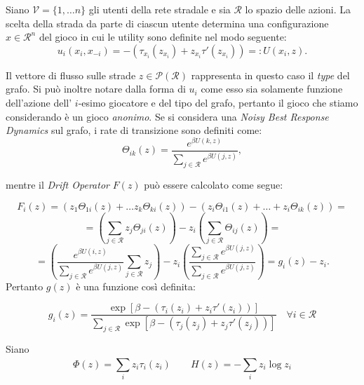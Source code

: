 \begin{alphaparts}
\questionpart %
Siano \(\mathcal{V} = \{1, \dots n\}\) gli utenti della rete stradale e sia \(\mathcal{R}\) lo spazio delle azioni. La scelta della strada da parte di ciascun utente determina una configurazione \(x \in \mathcal{R}^n\) del gioco in cui le utility sono definite nel modo seguente:
\[
    u_i (x_i, x_{- i}) = - (\tau_{x_i}(z_{x_i}) + z_{x_i}\tau'(z_{x_i})) = : U(x_{i}, z).\]

Il vettore di flusso sulle strade \(z \in \mathcal{P}(\mathcal{R})\) rappresenta in questo caso il \textit{type} del grafo. Si può inoltre notare dalla forma di \(u_i\) come esso sia solamente funzione dell'azione dell' \(i\)-esimo giocatore e del tipo del grafo, pertanto il gioco che stiamo considerando è un gioco \textit{anonimo}. Se si considera una \textit{Noisy Best Response Dynamics} sul grafo, i rate di transizione sono definiti come:
\begin{equation*}
    \Theta_{ik}(z) = \frac{e^{\beta U(k, z)}}{ \sum \limits_{j \in \mathcal{R}}^{} e^{\beta U(j, z)}},
\end{equation*} 

mentre il \textit{Drift Operator} \(F(z)\) può essere calcolato come segue:

\[
F_i(z) = (z_1 \Theta_{1i}(z) + \dots z_k \Theta_{ki}(z) ) - (z_i \Theta_{i1}(z) + \dots + z_i \Theta_{ik}(z) ) =
\]
\[ 
 = \left(\sum \limits_{j \in \mathcal{R}}^{} z_j \Theta_{ji}(z) \right) - z_i \left( \sum \limits_{j \in \mathcal{R}}^{} \Theta_{ij}(z)\right) =    
\]
\[
    = \left(\frac{e^{\beta U(i, z)}}{ \sum \limits_{j \in \mathcal{R}}^{} e^{\beta U(j, z)}}  \sum \limits_{j \in \mathcal{R}}^{} z_j \right) - z_i \left( \frac{\sum \limits_{j \in \mathcal{R}}^{} e^{\beta U(j, z)}}{ \sum \limits_{j \in \mathcal{R}}^{} e^{\beta U(j, z)}}\right) = g_i(z) - z_i.
\]
Pertanto \(g(z)\) è una funzione così definita:

\begin{equation*}
    g_i(z) = \frac{\exp [\beta - (\tau_{i}(z_{i}) + z_{i}\tau'(z_{i})) ]}{ \sum \limits_{j \in \mathcal{R}}^{} \exp [\beta - (\tau_{j}(z_{j}) + z_{j}\tau'(z_{j})) ]} \quad \forall i \in \mathcal{R}
\end{equation*}

\questionpart %
Siano
\[
    \Phi(z) =  \sum \limits_{i}^{} z
    _i \tau_i(z_i) \quad \quad H(z) = -  \sum \limits_{i}^{} z_i \log z_i\]


\end{alphaparts}
